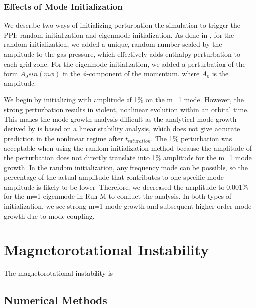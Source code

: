 \documentclass[iop,revtex4]{emulateapj}
\begin{document}
 \subsubsection{Effects of Mode Initialization}
\par  We describe two ways of initializing perturbation the simulation to trigger the \ac{PPI}: random initialization and eigenmode initialization. As done in  \cite{Hawley:1991A}, for the random initialization, we added a unique, random number scaled by the amplitude to the gas pressure, which effectively adds enthalpy perturbation to each grid zone. For the eigenmode initialization, we added a perturbation of the form $A_0 sin(m\phi)$ in the $\phi$-component of the momentum, where $A_0$ is the amplitude.
\par We begin by initializing with amplitude of 1\% on the m=1 mode. However, the strong perturbation results in violent, nonlinear evolution within an orbital time. This makes the mode growth analysis difficult as the analytical mode growth derived by \cite{Goldreich:1986A} is based on a linear stability analysis, which does not give accurate prediction in the nonlinear regime after $t_{saturation}$. The 1\% perturbation was acceptable when using the random initialization method because the amplitude of the perturbation does not directly translate into 1\% amplitude for the m=1 mode growth. In the random initialization,  any frequency mode can be possible, so the percentage of the actual amplitude that contributes to one specific mode amplitude is likely to be lower. Therefore, we decreased the amplitude to 0.001\% for the m=1 eigenmode in Run M to conduct the analysis. In both types of initialization, we see strong m=1 mode growth and subsequent higher-order mode growth due to mode coupling.
\section{Magnetorotational Instability}
\par The magnetorotational instability is 




  \subsection{Numerical Methods}
\end{document}
